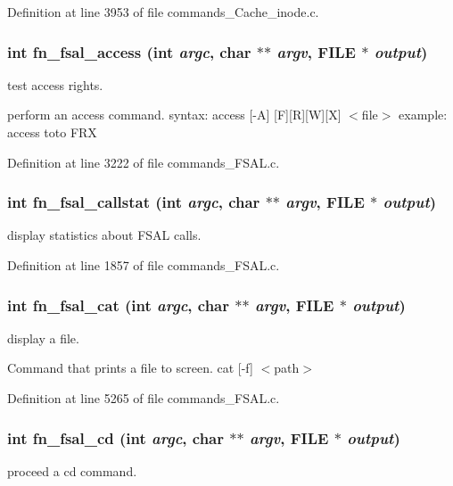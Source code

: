 Definition at line 3953 of file commands\_\-Cache\_\-inode.c.
\subsubsection[{fn\_\-fsal\_\-access}]{\setlength{\rightskip}{0pt plus 5cm}int fn\_\-fsal\_\-access (int {\em argc}, \/  char $\ast$$\ast$ {\em argv}, \/  FILE $\ast$ {\em output})}\label{commands_8h_aa55a8451b4dd88ef76baea99bbef6761}
test access rights.

perform an access command. syntax: access [-\/A] [F][R][W][X] $<$file$>$ example: access toto FRX 

Definition at line 3222 of file commands\_\-FSAL.c.
\subsubsection[{fn\_\-fsal\_\-callstat}]{\setlength{\rightskip}{0pt plus 5cm}int fn\_\-fsal\_\-callstat (int {\em argc}, \/  char $\ast$$\ast$ {\em argv}, \/  FILE $\ast$ {\em output})}\label{commands_8h_a4acd9c0eb120bb1f3dc888538b1996cb}
display statistics about FSAL calls. 

Definition at line 1857 of file commands\_\-FSAL.c.
\subsubsection[{fn\_\-fsal\_\-cat}]{\setlength{\rightskip}{0pt plus 5cm}int fn\_\-fsal\_\-cat (int {\em argc}, \/  char $\ast$$\ast$ {\em argv}, \/  FILE $\ast$ {\em output})}\label{commands_8h_afcf5d8ad163ca5a5aef0952851a37dbf}
display a file.

Command that prints a file to screen. cat [-\/f] $<$path$>$ 

Definition at line 5265 of file commands\_\-FSAL.c.
\subsubsection[{fn\_\-fsal\_\-cd}]{\setlength{\rightskip}{0pt plus 5cm}int fn\_\-fsal\_\-cd (int {\em argc}, \/  char $\ast$$\ast$ {\em argv}, \/  FILE $\ast$ {\em output})}\label{commands_8h_a1e383e905f534a477fa6002c8344114c}
proceed a cd command.

